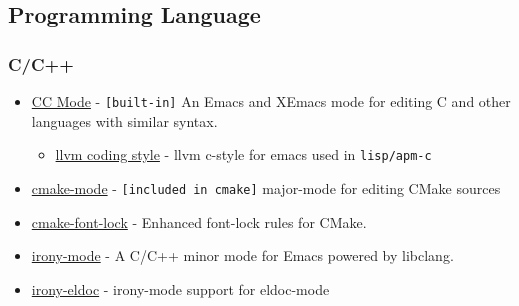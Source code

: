 \documentclass[11pt]{article}
\begin{document}
\subsection{Programming Language}
\label{sec-1-7}

\subsubsection{C/C++}
\label{sec-1-7-1}
\begin{itemize}
\item \href{http://cc-mode.sourceforge.net/}{CC Mode} - \texttt{[built-in]} An Emacs and XEmacs mode for editing C and other languages with similar syntax.
\begin{itemize}
\item \href{https://github.com/llvm-mirror/llvm/blob/master/utils/emacs/emacs.el}{llvm coding style} - llvm c-style for emacs used in \texttt{lisp/apm-c}
\end{itemize}
\item \href{https://cmake.org/Wiki/CMake/Editors/Emacs}{cmake-mode} - \texttt{[included in cmake]} major-mode for editing CMake sources
\item \href{https://github.com/Lindydancer/cmake-font-lock}{cmake-font-lock} - Enhanced font-lock rules for CMake.
\item \href{https://github.com/Sarcasm/irony-mode}{irony-mode} - A C/C++ minor mode for Emacs powered by libclang.
\item \href{https://github.com/ikirill/irony-eldoc}{irony-eldoc} - irony-mode support for eldoc-mode
\end{itemize}
\end{document}
